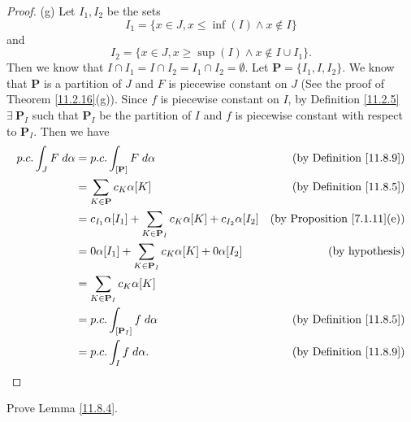 \begin{proof}{(g)}
    Let \(I_1, I_2\) be the sets
    \[
        I_1 = \{x \in J, x \leq \inf(I) \land x \notin I\}
    \]
    and
    \[
        I_2 = \{x \in J, x \geq \sup(I) \land x \notin I \cup I_1\}.
    \]
    Then we know that \(I \cap I_1 = I \cap I_2 = I_1 \cap I_2 = \emptyset\).
    Let \(\mathbf{P} = \{I_1, I, I_2\}\).
    We know that \(\mathbf{P}\) is a partition of \(J\) and \(F\) is piecewise constant on \(J\)
    (See the proof of Theorem \ref{11.2.16}(g)).
    Since \(f\) is piecewise constant on \(I\), by Definition \ref{11.2.5} \(\exists\ \mathbf{P}_I\) such that \(\mathbf{P}_I\) be the partition of \(I\) and \(f\) is piecewise constant with respect to \(\mathbf{P}_I\).
    Then we have
    \begin{align*}
        p.c. \int_J F \; d \alpha & = p.c. \int_{[\mathbf{P}]} F \; d \alpha                                              & \text{(by Definition \ref{11.8.9})}     \\
                                  & = \sum_{K \in \mathbf{P}} c_K \alpha[K]                                               & \text{(by Definition \ref{11.8.5})}     \\
                                  & = c_{I_1} \alpha[I_1] + \sum_{K \in \mathbf{P}_I} c_K \alpha[K] + c_{I_2} \alpha[I_2] & \text{(by Proposition \ref{7.1.11}(e))} \\
                                  & = 0 \alpha[I_1] + \sum_{K \in \mathbf{P}_I} c_K \alpha[K] + 0 \alpha[I_2]             & \text{(by hypothesis)}                  \\
                                  & = \sum_{K \in \mathbf{P}_I} c_K \alpha[K]                                                                                       \\
                                  & = p.c. \int_{[\mathbf{P}_I]} f \; d \alpha                                            & \text{(by Definition \ref{11.8.5})}     \\
                                  & = p.c. \int_I f \; d \alpha.                                                          & \text{(by Definition \ref{11.8.9})}
    \end{align*}
\end{proof}

\exercisesection

\begin{exercise}\label{ex 11.8.1}
    Prove Lemma \ref{11.8.4}.
\end{exercise}

